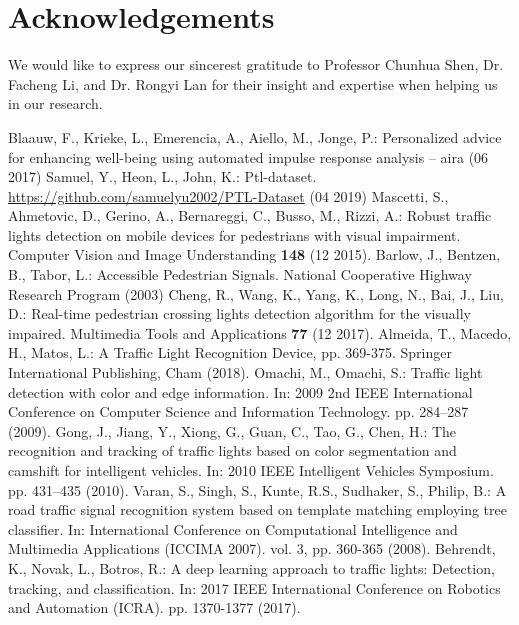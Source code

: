 \documentclass[runningheads]{llncs}
\begin{document}
\section{Acknowledgements}
We would like to express our sincerest gratitude to Professor Chunhua Shen, Dr. Facheng Li, and Dr. Rongyi Lan for their insight and expertise when helping us in our research.

{\RaggedRight
\begin{thebibliography}{8}
    Blaauw, F., Krieke, L., Emerencia, A., Aiello, M., Jonge, P.: Personalized advice for enhancing well-being using automated impulse response analysis – aira (06 2017)
    Samuel, Y., Heon, L., John, K.: Ptl-dataset. \url{https://github.com/samuelyu2002/PTL-Dataset} (04 2019)
    Mascetti, S., Ahmetovic, D., Gerino, A., Bernareggi, C., Busso, M., Rizzi, A.: Robust traffic lights detection on mobile devices for pedestrians with visual impairment. Computer Vision and Image Understanding \textbf{148} (12 2015). 
    Barlow, J., Bentzen, B., Tabor, L.: Accessible Pedestrian Signals. National Cooperative Highway Research Program (2003)
    Cheng, R., Wang, K., Yang, K., Long, N., Bai, J., Liu, D.: Real-time pedestrian crossing lights detection algorithm for the visually impaired. Multimedia Tools and Applications \textbf{77} (12 2017). 
    Almeida, T., Macedo, H., Matos, L.: A Traffic Light Recognition Device, pp. 369-375. Springer International Publishing, Cham (2018). 
    Omachi, M., Omachi, S.: Traffic light detection with color and edge information. In: 2009 2nd IEEE International Conference on Computer Science and Information Technology. pp. 284–287 (2009). 
    Gong, J., Jiang, Y., Xiong, G., Guan, C., Tao, G., Chen, H.: The recognition and tracking of traffic lights based on color segmentation and camshift for intelligent vehicles. In: 2010 IEEE Intelligent Vehicles Symposium. pp. 431–435 (2010). 
    Varan, S., Singh, S., Kunte, R.S., Sudhaker, S., Philip, B.: A road traffic signal recognition system based on template matching employing tree classifier. In: International Conference on Computational Intelligence and Multimedia Applications (ICCIMA 2007). vol. 3, pp. 360-365 (2008). 
    Behrendt, K., Novak, L., Botros, R.: A deep learning approach to traffic lights: Detection, tracking, and classification. In: 2017 IEEE International Conference on Robotics and Automation (ICRA). pp. 1370-1377 (2017). 

\end{thebibliography}}
\end{document}
